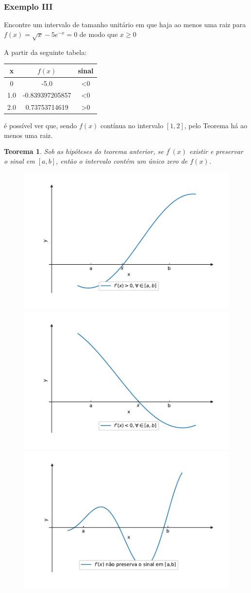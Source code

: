 \documentclass{beamer}
\newtheorem{teorema}[theorem]{Teorema}
\theoremstyle{mystyle}
\begin{document}
\begin{frame}
	\frametitle{Exemplo III}
	Encontre um intervalo de tamanho unitário em que haja ao menos uma raiz para $ f(x) = \sqrt{x} - 5 e^{-x} = 0 $ de modo que $ x \geq 0 $
	\pause

	A partir da seguinte tabela:
	\begin{table}
		\centering
		\begin{tabular}{c|c|c}
			x & $f(x)$ & sinal \\
			\hline
			\hline
			0 & -5.0 & <0 \\
			1.0 &  -0.839397205857 & <0 \\
			2.0 & 0.73753714619	& >0 
		\end{tabular}
	\end{table}
	é possível ver que, sendo $ f (x) $ contínua no intervalo $ [1, 2] $, pelo Teorema há ao menos uma raiz.	
\end{frame}

\begin{frame}
	\begin{teorema}
		Sob as hipóteses do teorema anterior, se $ f^{\prime} (x) $ existir e preservar o sinal em $ [a, b] $, então o intervalo contém um único zero de $ f (x) $.
	\end{teorema}
	\begin{figure}
		\centering
		\includegraphics[width=0.45\linewidth]{Figuras/grafico_05a}
		\includegraphics[width=0.45\linewidth]{Figuras/grafico_05b}
		\includegraphics[width=0.45\linewidth]{Figuras/grafico_05c}
		\label{fig:grafico05abc}
	\end{figure}	
\end{frame}
\end{document}
